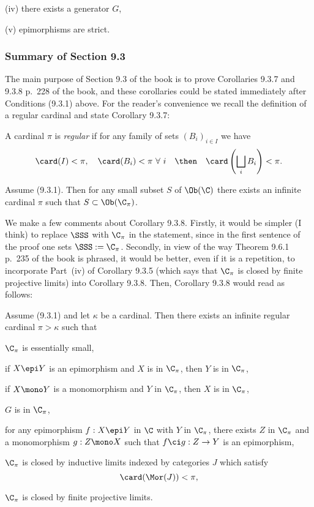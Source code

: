 \documentclass[12pt]{article}
\theoremstyle{remark}
\theoremstyle{definition}
\begin{document}
(iv) there exists a generator $G$,

(v) epimorphisms are strict.

\subsubsection{Summary of Section 9.3}

The main purpose of Section 9.3 of the book is to prove Corollaries 9.3.7 and 9.3.8 p.~228 of the book, and these corollaries could be stated immediately after Conditions (9.3.1) above. For the reader's convenience we recall the definition of a regular cardinal and state Corollary 9.3.7:

\begin{df} 
A cardinal $\pi$ is \emph{regular} if for any family of sets $(B_i)_{i\in I}$ we have 
$$
\card(I)<\pi,\quad\card(B_i)<\pi\ \forall\ i\quad\then\quad\card\left(\bigsqcup_iB_i\right)<\pi.
$$
\end{df}

\begin{cor}[Corollary 9.3.7 p. 228]
Assume (9.3.1). Then for any small subset $S$ of $\Ob(\C)$ there exists an infinite cardinal $\pi$ such that $S\subset\Ob(\C_\pi)$.
\end{cor}

We make a few comments about Corollary 9.3.8. Firstly, it would be simpler (I think) to replace $\SSS$ with $\C_\pi$ in the statement, since in the first sentence of the proof one sets $\SSS:=\C_\pi$. Secondly, in view of the way Theorem 9.6.1 p.~235 of the book is phrased, it would be better, even if it is a repetition, to incorporate Part~(iv) of Corollary 9.3.5 (which says that $\C_\pi$ is closed by finite projective limits) into Corollary 9.3.8. Then, Corollary 9.3.8 would read as follows:

\begin{cor}[Corollary 9.3.8 p.~227]
Assume (9.3.1) and let $\kappa$ be a cardinal. Then there exists an infinite regular cardinal $\pi>\kappa$ such that 

 $\C_\pi$ is essentially small,

 if $X\epi Y$ is an epimorphism and $X$ is in $\C_\pi$, then $Y$ is in $\C_\pi$,

 if $X\mono Y$ is a monomorphism and $Y$ in $\C_\pi$, then $X$ is in $\C_\pi$,

 $G$ is in $\C_\pi$,

 for any epimorphism $f:X\epi Y$ in $\C$ with $Y$ in $\C_\pi$, there exists $Z$ in $\C_\pi$ and a monomorphism $g:Z\mono X$ such that $f\ci g:Z\to Y$ is an epimorphism,

 $\C_\pi$ is closed by inductive limits indexed by categories $J$ which satisfy $$\card(\Mor(J))<\pi,$$

 $\C_\pi$ is closed by finite projective limits.
\end{cor}
\end{document}

